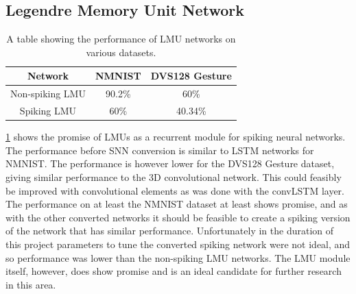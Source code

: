 \subsection{Legendre Memory Unit Network}

\begin{table}[htb]
    \centering
    \begin{tabular}{|| c | c | c ||}
        \hline
        Network     & NMNIST & DVS128 Gesture \\
        \hline \hline
        Non-spiking LMU        &  90.2\%    &    60\%  \\
        \hline
        Spiking LMU        &  60\%    &   40.34\%   \\
        \hline
    \end{tabular}
    \caption{A table showing the performance of LMU networks on various datasets.}
    \label{tab:lmu_performance}
\end{table}

\cref{tab:lmu_performance} shows the promise of LMUs as a recurrent module for spiking neural networks. The performance before SNN conversion is similar to LSTM networks for NMNIST. The performance is however lower for the DVS128 Gesture dataset, giving similar performance to the 3D convolutional network. This could feasibly be improved with convolutional elements as was done with the convLSTM layer. The performance on at least the NMNIST dataset at least shows promise, and as with the other converted networks it should be feasible to create a spiking version of the network that has similar performance. Unfortunately in the duration of this project parameters to tune the converted spiking network were not ideal, and so performance was lower than the non-spiking LMU networks. The LMU module itself, however, does show promise and is an ideal candidate for further research in this area.